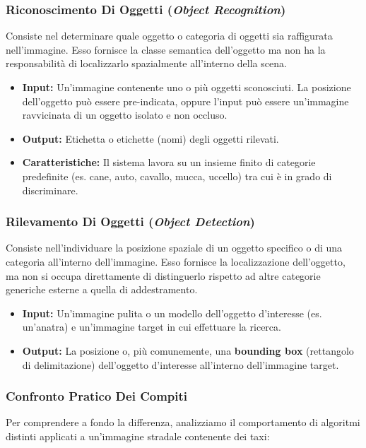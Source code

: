 ﻿\documentclass[11pt, a4paper]{article}
\begin{document}
\subsubsection{Riconoscimento Di Oggetti (\emph{Object Recognition})}
Consiste nel determinare quale oggetto o categoria di oggetti sia raffigurata nell'immagine. Esso fornisce la classe semantica dell'oggetto ma non ha la responsabilità di localizzarlo spazialmente all'interno della scena.
\begin{itemize}
    \item \textbf{Input:} Un'immagine contenente uno o più oggetti sconosciuti. La posizione dell'oggetto può essere pre-indicata, oppure l'input può essere un'immagine ravvicinata di un oggetto isolato e non occluso.
    \item \textbf{Output:} Etichetta o etichette (nomi) degli oggetti rilevati.
    \item \textbf{Caratteristiche:} Il sistema lavora su un insieme finito di categorie predefinite (es. cane, auto, cavallo, mucca, uccello) tra cui è in grado di discriminare.
\end{itemize}

\subsubsection{Rilevamento Di Oggetti (\emph{Object Detection})}
Consiste nell'individuare la posizione spaziale di un oggetto specifico o di una categoria all'interno dell'immagine. Esso fornisce la localizzazione dell'oggetto, ma non si occupa direttamente di distinguerlo rispetto ad altre categorie generiche esterne a quella di addestramento.
\begin{itemize}
    \item \textbf{Input:} Un'immagine pulita o un modello dell'oggetto d'interesse (es. un'anatra) e un'immagine target in cui effettuare la ricerca.
    \item \textbf{Output:} La posizione o, più comunemente, una \textbf{bounding box} (rettangolo di delimitazione) dell'oggetto d'interesse all'interno dell'immagine target.
\end{itemize}

\subsubsection{Confronto Pratico Dei Compiti}

Per comprendere a fondo la differenza, analizziamo il comportamento di algoritmi distinti applicati a un'immagine stradale contenente dei taxi:
\end{document}
